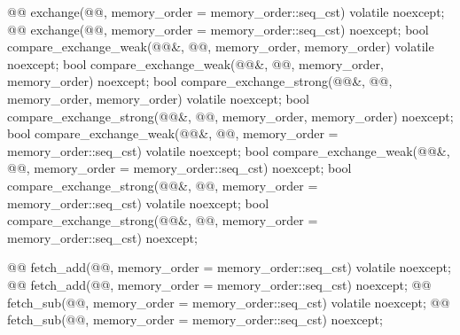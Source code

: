 \begin{codeblock}
{{    @@ exchange(@@,
                                 memory_order = memory_order::seq_cst) volatile noexcept;
    @@ exchange(@@,
                                 memory_order = memory_order::seq_cst) noexcept;
    bool compare_exchange_weak(@@&, @@,
                               memory_order, memory_order) volatile noexcept;
    bool compare_exchange_weak(@@&, @@,
                               memory_order, memory_order) noexcept;
    bool compare_exchange_strong(@@&, @@,
                                 memory_order, memory_order) volatile noexcept;
    bool compare_exchange_strong(@@&, @@,
                                 memory_order, memory_order) noexcept;
    bool compare_exchange_weak(@@&, @@,
                               memory_order = memory_order::seq_cst) volatile noexcept;
    bool compare_exchange_weak(@@&, @@,
                               memory_order = memory_order::seq_cst) noexcept;
    bool compare_exchange_strong(@@&, @@,
                                 memory_order = memory_order::seq_cst) volatile noexcept;
    bool compare_exchange_strong(@@&, @@,
                                 memory_order = memory_order::seq_cst) noexcept;

    @@ fetch_add(@@,
                                  memory_order = memory_order::seq_cst) volatile noexcept;
    @@ fetch_add(@@,
                                  memory_order = memory_order::seq_cst) noexcept;
    @@ fetch_sub(@@,
                                  memory_order = memory_order::seq_cst) volatile noexcept;
    @@ fetch_sub(@@,
                                  memory_order = memory_order::seq_cst) noexcept;

}}
\end{codeblock}
